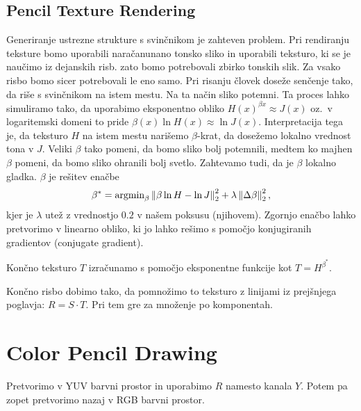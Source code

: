 \subsection{Pencil Texture Rendering}
Generiranje ustrezne strukture s svinčnikom je zahteven problem. Pri rendiranju teksture bomo uporabili naračanunano tonsko sliko in uporabili teksturo, ki se je naučimo iz dejanskih risb. zato bomo potrebovali zbirko tonskih slik. Za vsako risbo bomo sicer potrebovali le eno samo. Pri risanju človek doseže senčenje tako, da riše s svinčnikom na istem mestu. Na ta način sliko potemni. Ta proces lahko simuliramo tako, da uporabimo eksponentno obliko $H(x)^{\beta{x}} \approx J(x)$ oz.\ v logaritemski domeni to pride $\beta(x) \ln H(x) \approx \ln J(x)$. Interpretacija tega je, da teksturo $H$ na istem mestu narišemo $\beta$-krat, da dosežemo lokalno vrednost tona v $J$. Veliki $\beta$ tako pomeni, da bomo sliko bolj potemnili, medtem ko majhen $\beta$ pomeni, da bomo sliko ohranili bolj svetlo. Zahtevamo tudi, da je $\beta$ lokalno gladka. $\beta$ je rešitev enačbe
$$\beta^* = \textup{argmin}_\beta \left\|\beta \ln H - \ln J\right\|_2^2 + \lambda \left\|\Delta \beta\right\|_2^2,$$
kjer je $\lambda$ utež z vrednostjo $0.2$ v našem poksusu (njihovem). Zgornjo enačbo lahko pretvorimo v linearno obliko, ki jo lahko rešimo s pomočjo konjugiranih gradientov (conjugate gradient).

Končno teksturo $T$ izračunamo s pomočjo eksponentne funkcije kot $T = H^{\beta^*}$.

Končno risbo dobimo tako, da pomnožimo to teksturo z linijami iz prejšnjega poglavja: $R = S \cdot T$. Pri tem gre za množenje po komponentah.
\section{Color Pencil Drawing}
Pretvorimo v YUV barvni prostor in uporabimo $R$ namesto kanala $Y$. Potem pa zopet pretvorimo nazaj v RGB barvni prostor.
